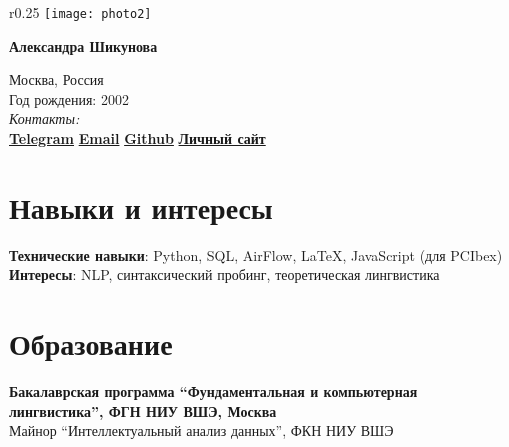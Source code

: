 \documentclass[11pt]{article} %
\begin{document}

\begin{wrapfigure}{r}{0.25\textwidth} %
    \centering
    \texttt{[image: photo2]}
\end{wrapfigure}
{\LARGE\bfseries Александра Шикунова} %
\bigskip\bigskip\medskip %

Москва, Россия\\
Год рождения: 2002\\

\textit{Контакты:}\\
\textbf{\href{https://t.me/thnlgrlivrlvdwsbrnwthrssnhrys}{Telegram}} \hspace*{2em}
\textbf{\href{mailto:notalexandrashikunova@gmail.com}{Email}} \hspace*{2em}
\textbf{\href{https://github.com/poisongrapevine}{Github}} \hspace*{2em}
\textbf{\href{https://thddbptnsndshs.github.io/academic_site/}{Личный сайт}}
\medskip %


\section*{Навыки и интересы}

\textbf{Технические навыки}: Python, SQL, AirFlow, LaTeX, JavaScript (для PCIbex)\\
\textbf{Интересы}: NLP, синтаксический пробинг, теоретическая лингвистика


\section*{Образование}

\textbf{Бакалаврская программа ``Фундаментальная и компьютерная лингвистика'', ФГН НИУ ВШЭ, Москва}\\
 Майнор ``Интеллектуальный анализ данных'', ФКН НИУ ВШЭ
\end{document}
